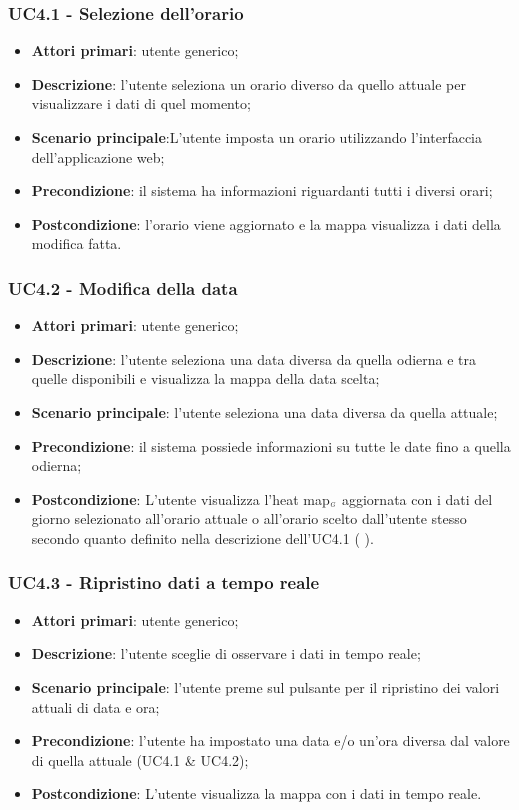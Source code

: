 \subsubsection{UC4.1 - Selezione dell’orario}
\begin{itemize}
	\item \textbf{Attori primari}: utente generico;
	\item \textbf{Descrizione}: l’utente seleziona un orario diverso da quello attuale per visualizzare i dati di quel momento;
	\item \textbf{Scenario principale}:L’utente imposta un orario utilizzando l’interfaccia dell’applicazione web;
	\item \textbf{Precondizione}: il sistema ha informazioni riguardanti tutti i diversi orari; %
	\item \textbf{Postcondizione}:  l’orario viene aggiornato e la mappa visualizza i dati della modifica fatta.
\end{itemize}

\subsubsection{UC4.2 - Modifica della data}
\begin{itemize}
	\item \textbf{Attori primari}: utente generico;
	\item \textbf{Descrizione}: l’utente seleziona una data diversa da quella odierna e tra quelle disponibili e visualizza la mappa della data scelta;
	\item \textbf{Scenario principale}: l’utente seleziona una data diversa da quella attuale;
	\item \textbf{Precondizione}: il sistema possiede informazioni su tutte le date fino a quella odierna;
	\item \textbf{Postcondizione}: L’utente visualizza l’heat map$_{\scaleto{G}{3pt}}$ aggiornata con i dati del giorno selezionato all’orario attuale o all’orario scelto dall’utente stesso secondo quanto definito nella descrizione dell’UC4.1 ( ).
\end{itemize}

\subsubsection{UC4.3 - Ripristino dati a tempo reale}
\begin{itemize}
	\item \textbf{Attori primari}: utente generico;
	\item \textbf{Descrizione}:  l’utente sceglie di osservare i dati in tempo reale;
	\item \textbf{Scenario principale}: l’utente preme sul pulsante per il ripristino dei valori attuali di data e ora;
	\item \textbf{Precondizione}: l’utente ha impostato una data e/o un’ora diversa dal valore di quella attuale (UC4.1 \& UC4.2);
	\item \textbf{Postcondizione}: L’utente visualizza la mappa con i dati in tempo reale.
\end{itemize}


